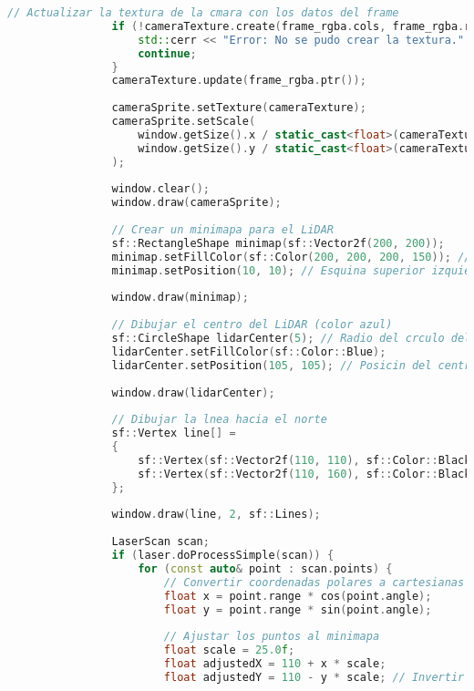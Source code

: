 \begin{lstlisting}[language={C++}, caption={Segundo ajuste de c\'odigo}, label={SegundoAjuste}]
                // Actualizar la textura de la cmara con los datos del frame
                if (!cameraTexture.create(frame_rgba.cols, frame_rgba.rows)) {
                    std::cerr << "Error: No se pudo crear la textura." << std::endl;
                    continue;
                }
                cameraTexture.update(frame_rgba.ptr());
        
                cameraSprite.setTexture(cameraTexture);
                cameraSprite.setScale(
                    window.getSize().x / static_cast<float>(cameraTexture.getSize().x),
                    window.getSize().y / static_cast<float>(cameraTexture.getSize().y)
                );
        
                window.clear();
                window.draw(cameraSprite);
        
                // Crear un minimapa para el LiDAR
                sf::RectangleShape minimap(sf::Vector2f(200, 200));
                minimap.setFillColor(sf::Color(200, 200, 200, 150)); // Fondo semitransparente
                minimap.setPosition(10, 10); // Esquina superior izquierda
        
                window.draw(minimap);
        
                // Dibujar el centro del LiDAR (color azul)
                sf::CircleShape lidarCenter(5); // Radio del crculo del LiDAR
                lidarCenter.setFillColor(sf::Color::Blue);
                lidarCenter.setPosition(105, 105); // Posicin del centro en el minimapa
        
                window.draw(lidarCenter);
        
                // Dibujar la lnea hacia el norte
                sf::Vertex line[] =
                {
                    sf::Vertex(sf::Vector2f(110, 110), sf::Color::Black),
                    sf::Vertex(sf::Vector2f(110, 160), sf::Color::Black) // Lnea hacia arriba (norte)
                };
        
                window.draw(line, 2, sf::Lines);
        
                LaserScan scan;
                if (laser.doProcessSimple(scan)) {
                    for (const auto& point : scan.points) {
                        // Convertir coordenadas polares a cartesianas
                        float x = point.range * cos(point.angle);
                        float y = point.range * sin(point.angle);
        
                        // Ajustar los puntos al minimapa
                        float scale = 25.0f;
                        float adjustedX = 110 + x * scale;
                        float adjustedY = 110 - y * scale; // Invertir Y para coordinar con la pantalla
        

\end{lstlisting}
